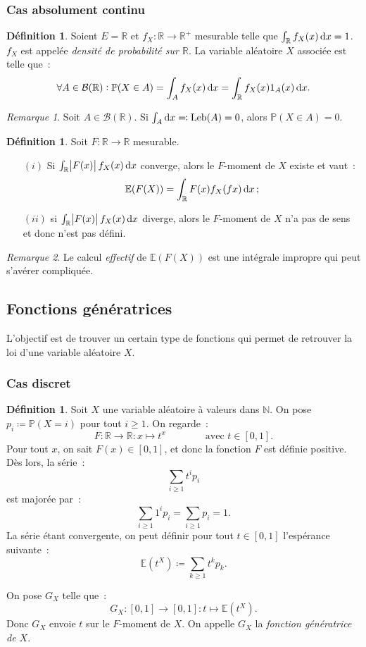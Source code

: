 \documentclass{article}
\newcommand{\E}{\mathbb E}
\newcommand{\N}{\mathbb N}
\renewcommand{\P}{\mathbb P}
\newcommand{\R}{\mathbb R}
\DeclareMathOperator{\Leb}{Leb}
\theoremstyle{definition}
\newtheorem{déf}[thm]{Définition}
\theoremstyle{remark}
\newtheorem*{rmq}{Remarque}
\begin{document}
		\subsubsection{Cas absolument continu}
		\begin{déf} Soient $E = \R$ et $f_X : \R \to \R^+$ mesurable telle que $\int_\R f_X(x)\dif x = 1$. $f_X$ est appelée \emph{densité de probabilité sur
		$\R$}. La variable aléatoire $X$ associée est telle que~:
		\[\forall A \in \mathcal B(\R) : \P(X \in A) = \int_A f_X(x)\dif x = \int_\R f_X(x)1_A(x)\dif x.\]
		\end{déf}

		\begin{rmq} Soit $A \in \mathcal B(\R)$. Si $\int_A\dif x \eqqcolon \Leb(A) = 0$, alors $\P(X \in A) = 0$. \end{rmq}

		\begin{déf} Soit $F : \R \to \R$ mesurable.

		\begin{itemize}
			\item[$(i)$] Si $\int_\R \abs{F(x)}f_X(x)\dif x$ converge, alors le $F$-moment de $X$ existe et vaut~:
			             \[\E(F(X)) = \int_\R F(x)f_X(fx)\dif x\,;\]
			\item[$(ii)$] si $\int_\R \abs{F(x)}f_X(x)\dif x$ diverge, alors le $F$-moment de $X$ n'a pas de sens et donc n'est pas défini.
		\end{itemize}
		\end{déf}

		\begin{rmq} Le calcul \emph{effectif} de $\E(F(X))$ est une intégrale impropre qui peut s'avérer compliquée. \end{rmq}

	\subsection{Fonctions génératrices}
		L'objectif est de trouver un certain type de fonctions qui permet de retrouver la loi d'une variable aléatoire $X$.

		\subsubsection{Cas discret}
		\begin{déf} Soit $X$ une variable aléatoire à valeurs dans $\N$. On pose $p_i \coloneqq \P(X = i)$ pour tout $i \geq 1$.
		On regarde~:
		\[F : \R \to \R : x \mapsto t^x\qquad\qquad\text{avec }t \in [0, 1].\]
		Pour tout $x$, on sait $F(x) \in [0, 1]$, et donc la fonction $F$ est définie positive. Dès lors, la série~:
		\[\sum_{i \geq 1}t^ip_i\]
		est majorée par~:
		\[\sum_{i \geq 1}1^ip_i = \sum_{i \geq 1}p_i = 1.\]
		La série étant convergente, on peut définir pour tout $t \in [0, 1]$ l'espérance suivante~:
		\[\E(t^X) \coloneqq \sum_{k \geq 1}t^kp_k.\]

		On pose $G_X$ telle que~:
		\[G_X : [0, 1] \to [0, 1] : t \mapsto \E(t^X).\]
		Donc $G_X$ envoie $t$ sur le $F$-moment de $X$. On appelle $G_X$ la \emph{fonction génératrice de $X$}.
		\end{déf}
\end{document}
